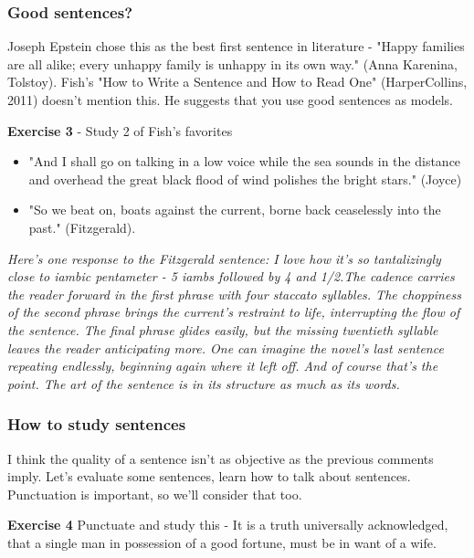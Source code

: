 \documentclass[11pt]{article}
\newenvironment{narrow}[2]{%
 \begin{list}{}{%
  \setlength{\topsep}{0pt}%
  \setlength{\leftmargin}{#1}%
  \setlength{\rightmargin}{#2}%
  \setlength{\listparindent}{\parindent}%
  \setlength{\itemindent}{\parindent}%
  \setlength{\parsep}{\parskip}%
 }%
\item[]}{\end{list}}
\begin{document}
\subsubsection*{Good sentences?}

Joseph Epstein chose this as the best first sentence in literature - "Happy families are all alike; every unhappy family is unhappy in its own way." (Anna Karenina, Tolstoy).
Fish's "How to Write a Sentence and How to Read One" (HarperCollins, 2011)  doesn't mention this. He suggests that you use good sentences as models. 


\begin{narrow}{1.0cm}{1.0cm}
\textbf{Exercise 3} - Study 2 of Fish's favorites
\end{narrow}


\begin{itemize}
\item "And I shall go on talking in a low voice while the sea sounds in the
distance and overhead the great black flood of wind polishes the
bright stars." (Joyce)
\item "So we beat on, boats against the current, borne back ceaselessly
    into the past." (Fitzgerald).
\end{itemize}



\textit{Here's one response to the Fitzgerald sentence: I love how it's so tantalizingly close to iambic pentameter - 5 iambs
followed by 4 and 1/2.The cadence carries the reader forward in the
first phrase with four staccato syllables. The choppiness of the
second phrase brings the current's restraint to life, interrupting the
flow of the sentence. The final phrase glides easily, but the missing
twentieth syllable leaves the reader anticipating more. One can
imagine the novel's last sentence repeating endlessly, beginning again
where it left off. And of course that's the point. The art of the
sentence is in its structure as much as its words.}


 
\subsubsection*{How to study sentences}
I think the quality of a sentence isn't as objective as the previous comments imply. Let's evaluate some sentences, learn how to talk about sentences. Punctuation is important, so we'll consider that too.



\begin{narrow}{1.0cm}{1.0cm}
\textbf{Exercise 4} Punctuate and study this - It is a truth universally acknowledged, that a single man in possession of a good fortune, must be in want of a wife.
\end{narrow}
\end{document}
